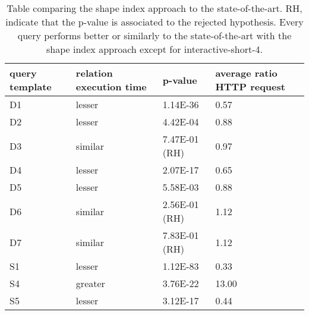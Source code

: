 \begin{table}
	\begin{center}
		\begin{tabular}{|l|l|l|l|}
			\hline
			query template & relation execution time & p-value & average ratio HTTP request \\
			\hline
			D1 & lesser & 1.14E-36 & 0.57 \\
			\hline
			D2 & lesser & 4.42E-04 & 0.88 \\
			\hline
			D3 & similar & 7.47E-01 (RH) & 0.97 \\
			\hline
			D4 & lesser & 2.07E-17 & 0.65 \\
			\hline
			D5 & lesser & 5.58E-03 & 0.88 \\
			\hline
			D6 & similar & 2.56E-01 (RH) & 1.12 \\
			\hline
			D7 & similar & 7.83E-01 (RH) & 1.12 \\
			\hline
			S1 & lesser & 1.12E-83 & 0.33 \\
			\hline
			S4 & greater & 3.76E-22 & 13.00 \\
			\hline
			S5 & lesser & 3.12E-17 & 0.44 \\
			\hline
		\end{tabular}
	\end{center}
	\caption{Table comparing the shape index approach to the state-of-the-art. RH, indicate that the p-value is associated to the rejected hypothesis. Every query performs better or similarly to the state-of-the-art with the shape index approach except for interactive-short-4.}
	\label{tab:statSignificanceStateOfTheArt}
\end{table}